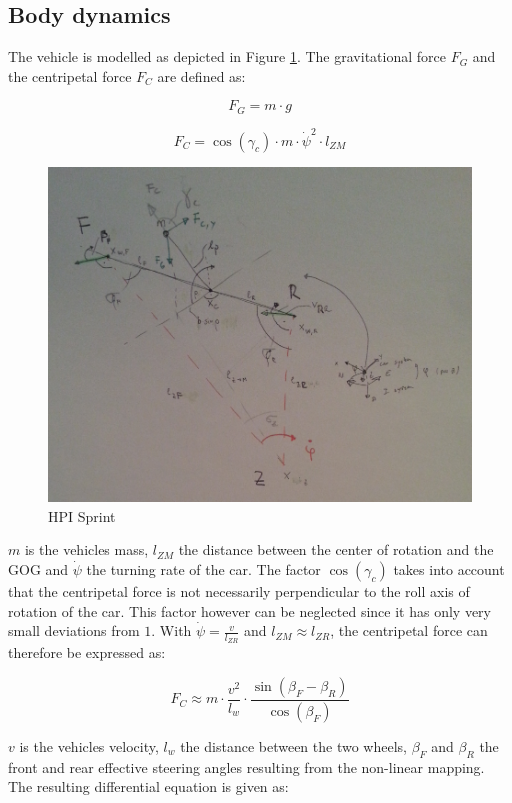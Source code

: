 \documentclass[conference]{IEEEtran}
\begin{document}
\subsection{Body dynamics}

The vehicle is modelled as depicted in Figure \ref{figure:geometry}. The gravitational force $F_G$ and the centripetal force $F_C$ are defined as:

\begin{equation}
{F_G} = m \cdot g
\end{equation}

\begin{equation}
{F_C} = \cos \left( {{\gamma _c}} \right) \cdot m \cdot {{\dot \psi }^2} \cdot {l_{ZM}}
\end{equation}

\begin{figure}[h]
\centering
  \includegraphics[width=.47\textwidth]{pics/geometry} 
  \caption{HPI Sprint}  
  \label{figure:geometry}
\end{figure}

$m$ is the vehicles mass, $l_{ZM}$ the distance between the center of rotation and the GOG and $\dot \psi$ the turning rate of the car. The factor $\cos \left( {{\gamma _c}} \right)$ takes into account that the centripetal force is not necessarily perpendicular to the roll axis of rotation of the car. This factor however can be neglected since it has only very small deviations from $1$. With $\dot \psi  = \frac{v}{{{l_{ZR}}}}$ and ${l_{ZM}} \approx {l_{ZR}}$, the centripetal force can therefore be expressed as:

\begin{equation}
{F_C} \approx m \cdot \frac{{{v^2}}}{{{l_w}}} \cdot \frac{{\sin \left( {{\beta _F} - {\beta _R}} \right)}}{{\cos \left( {{\beta _F}} \right)}}
\end{equation}

$v$ is the vehicles velocity, $l_w$ the distance between the two wheels, $\beta_F$ and $\beta_R$ the front and rear effective steering angles resulting from the non-linear mapping. The resulting differential equation is given as:
\end{document}
